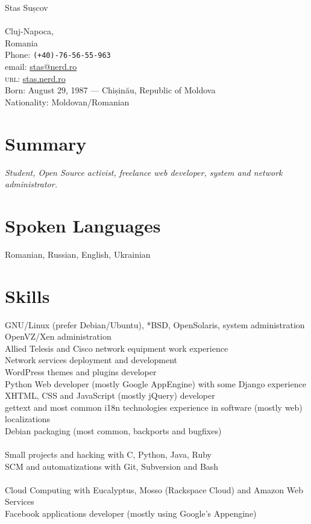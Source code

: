 \documentclass[10pt, a4paper]{article}
\begin{document}
{\LARGE Stas Sușcov}\\[1cm]
\\
 Cluj-Napoca,\\
Romania\\[.2cm]
Phone: \texttt{(+40)-76-56-55-963}\\[.2cm]
email: \href{mailto:stas@nerd.ro}{stas@nerd.ro}\\
\textsc{url}: \href{http://stas.nerd.ro/index.php/about/}{stas.nerd.ro}\\ 
\vfill
 Born:  August 29, 1987 --- Chișinău, Republic of Moldova\\
Nationality:  Moldovan/Romanian

\section*{Summary}
\emph{Student, Open Source activist, freelance web developer, system and network administrator.} 

\section*{Spoken Languages}
 Romanian, Russian, English, Ukrainian

\section*{Skills}
 GNU/Linux (prefer Debian/Ubuntu), *BSD, OpenSolaris, system administration\\
OpenVZ/Xen administration\\
Allied Telesis and Cisco network equipment work experience\\
Network services deployment and development\\
WordPress themes and plugins developer\\
Python Web developer (mostly Google AppEngine) with some Django experience\\
XHTML, CSS and JavaScript (mostly jQuery) developer\\
gettext and most common i18n technologies experience in software (mostly web) localizations\\
Debian packaging (most common, backports and bugfixes)\\
\\
Small projects and hacking with C, Python, Java, Ruby\\
SCM and automatizations with Git, Subversion and Bash\\
\\
Cloud Computing with Eucalyptus, Mosso (Rackspace Cloud) and Amazon Web Services
\\
Facebook applications developer (mostly using Google's Appengine)
\end{document}
